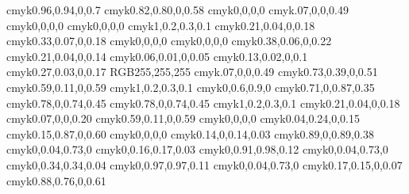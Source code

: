 \definecolor{firstpagetop@bg@color}		{cmyk}{0.96,0.94,0,0.7}
\definecolor{firstpagebottom@bg@color}	{cmyk}{0.82,0.80,0,0.58}
\definecolor{titledoc@color}				{cmyk}{0,0,0,0}
\definecolor{firstpage@lines@color}		{cmyk}{.07,0,0,0.49}
\definecolor{titleauthor@color}			{cmyk}{0,0,0,0}
\definecolor{titledate@color}			{cmyk}{0,0,0,0}
\definecolor{chapter@bg@color}			{cmyk}{1,0.2,0.3,0.1}
\definecolor{chapterdegrade@color}		{cmyk}{0.21,0.04,0,0.18}
\definecolor{chapterellipse@bg@color}	{cmyk}{0.33,0.07,0,0.18}
\definecolor{chapterellipse@color}		{cmyk}{0,0,0,0}
\definecolor{chaptertitlename@color}		{cmyk}{0,0,0,0}
\definecolor{chapterrule@color}			{cmyk}{0.38,0.06,0,0.22}
\definecolor{chaptermidcircle@color}		{cmyk}{0.21,0.04,0,0.14}
\definecolor{chapterbotcircle@color}		{cmyk}{0.06,0.01,0,0.05}
\definecolor{chaptertopcircle@color}		{cmyk}{0.13,0.02,0,0.1}
\definecolor{chapterline@color}			{cmyk}{0.27,0.03,0,0.17}
\definecolor{pagenumber@bg@color}		{RGB}{255,255,255}
\definecolor{shadow@color}				{cmyk}{.07,0,0,0.49}
\definecolor{chapterintro@color}			{cmyk}{0.73,0.39,0,0.51}
\definecolor{chapter@title@color}		{cmyk}{0.59,0.11,0,0.59}
\definecolor{section@title@color}		{cmyk}{1,0.2,0.3,0.1}
\definecolor{subsection@title@color}		{cmyk}{0,0.6,0.9,0}
\definecolor{subsubsection@title@color}	{cmyk}{0.71,0,0.87,0.35}
\definecolor{paragraph@title@color}		{cmyk}{0.78,0,0.74,0.45}
\definecolor{subparagraph@title@color}	{cmyk}{0.78,0,0.74,0.45}
\definecolor{arrayrule@color}			{cmyk}{1,0.2,0.3,0.1}
\definecolor{cell@color}					{cmyk}{0.21,0.04,0,0.18}
\definecolor{rem@bg@color}				{cmyk}{0.07,0,0,0.20}
\definecolor{remtitle@bg@color}			{cmyk}{0.59,0.11,0,0.59}
\definecolor{remtitle@color}				{cmyk}{0,0,0,0}
\definecolor{meth@bg@color}				{cmyk}{0.04,0.24,0,0.15}
\definecolor{methtitle@bg@color}			{cmyk}{0.15,0.87,0,0.60}
\definecolor{methtitle@color}			{cmyk}{0,0,0,0}
\definecolor{def@bg@color}				{cmyk}{0.14,0,0.14,0.03}
\definecolor{deftitle@bg@color}			{cmyk}{0.89,0,0.89,0.38}
\definecolor{deftitle@color}				{cmyk}{0,0.04,0.73,0}
\definecolor{prop@bg@color}				{cmyk}{0,0.16,0.17,0.03}
\definecolor{proptitle@bg@color}			{cmyk}{0,0.91,0.98,0.12}
\definecolor{proptitle@color}			{cmyk}{0,0.04,0.73,0}
\definecolor{thm@bg@color}				{cmyk}{0,0.34,0.34,0.04}
\definecolor{thmtitle@bg@color}			{cmyk}{0,0.97,0.97,0.11}
\definecolor{thmtitle@color}				{cmyk}{0,0.04,0.73,0}
\definecolor{ex@bg@color}				{cmyk}{0.17,0.15,0,0.07}
\definecolor{extitle@bg@color}			{cmyk}{0.88,0.76,0,0.61}

